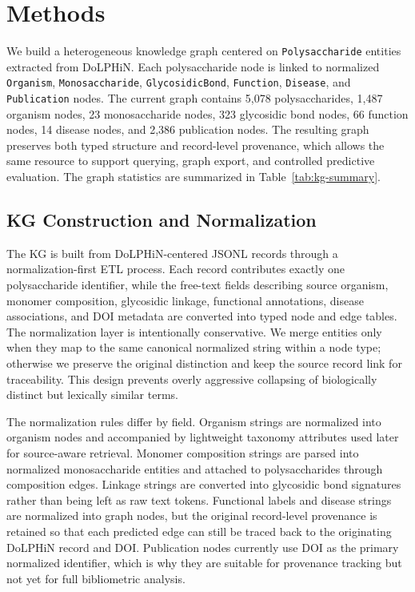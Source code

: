 \documentclass[11pt]{article}
\begin{document}
\section{Methods}
\label{sec:methods}

We build a heterogeneous knowledge graph centered on \texttt{Polysaccharide} entities extracted from DoLPHiN. Each polysaccharide node is linked to normalized \texttt{Organism}, \texttt{Monosaccharide}, \texttt{GlycosidicBond}, \texttt{Function}, \texttt{Disease}, and \texttt{Publication} nodes. The current graph contains 5,078 polysaccharides, 1,487 organism nodes, 23 monosaccharide nodes, 323 glycosidic bond nodes, 66 function nodes, 14 disease nodes, and 2,386 publication nodes. The resulting graph preserves both typed structure and record-level provenance, which allows the same resource to support querying, graph export, and controlled predictive evaluation. The graph statistics are summarized in Table~\ref{tab:kg-summary}.

\subsection{KG Construction and Normalization}
\label{sec:kg-construction}

The KG is built from DoLPHiN-centered JSONL records through a normalization-first ETL process. Each record contributes exactly one polysaccharide identifier, while the free-text fields describing source organism, monomer composition, glycosidic linkage, functional annotations, disease associations, and DOI metadata are converted into typed node and edge tables. The normalization layer is intentionally conservative. We merge entities only when they map to the same canonical normalized string within a node type; otherwise we preserve the original distinction and keep the source record link for traceability. This design prevents overly aggressive collapsing of biologically distinct but lexically similar terms.

The normalization rules differ by field. Organism strings are normalized into organism nodes and accompanied by lightweight taxonomy attributes used later for source-aware retrieval. Monomer composition strings are parsed into normalized monosaccharide entities and attached to polysaccharides through composition edges. Linkage strings are converted into glycosidic bond signatures rather than being left as raw text tokens. Functional labels and disease strings are normalized into graph nodes, but the original record-level provenance is retained so that each predicted edge can still be traced back to the originating DoLPHiN record and DOI. Publication nodes currently use DOI as the primary normalized identifier, which is why they are suitable for provenance tracking but not yet for full bibliometric analysis.
\end{document}
